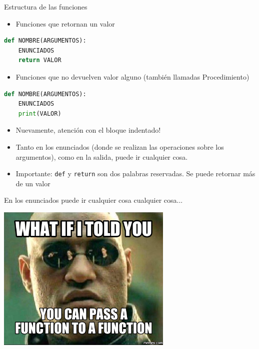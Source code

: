 \documentclass{beamer}
\begin{document}
\begin{frame}[fragile]{Estructura de las funciones} \pause


\begin{itemize}
	\item Funciones que retornan un valor
\end{itemize}
\begin{lstlisting}[language=Python]
def NOMBRE(ARGUMENTOS):
    ENUNCIADOS 
    return VALOR
\end{lstlisting} \pause

\begin{itemize}
        \item Funciones que no devuelven valor alguno (también llamadas Procedimiento)   
\end{itemize}
\begin{lstlisting}[language=Python]
def NOMBRE(ARGUMENTOS):
    ENUNCIADOS
    print(VALOR)
\end{lstlisting} \pause

\begin{itemize}
	\item Nuevamente, atención con el bloque indentado! \pause
	\item Tanto en los enunciados (donde se realizan las operaciones sobre los argumentos), como en la salida, puede ir cualquier cosa. \pause
	\item \alert{Importante:} \texttt{def} y \texttt{return} son dos palabras reservadas. \pause Se puede retornar más de un valor
\end{itemize}

\end{frame}


\begin{frame}{En los enunciados puede ir cualquier cosa cualquier cosa...} \pause
\begin{center}
\includegraphics[height=7cm, scale=0.5]{recursos/meme_funciones.png}
\end{center}
\end{frame}
\end{document}
